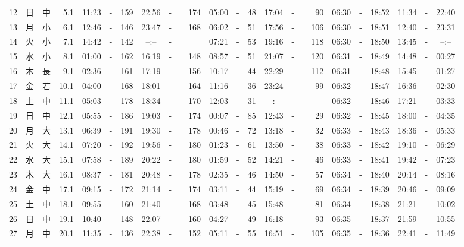 \documentclass[12pt,a4j]{jsarticle}
\begin{document}
\begin{table}[htbp]
\begin{center}
{\begin{tabular}{|rc|cr|ccrccr|ccrccr|ccc|ccc|}
12 & 日 & 中 &  5.1 &  11:23 &-& 159 &  22:56 &-& 174 &  05:00 &-&  48 &  17:04 &-&  90 & 06:30 & -& 18:52 & 11:34 & -& 22:40 \\
13 & 月 & 小 &  6.1 &  12:46 &-& 146 &  23:47 &-& 168 &  06:02 &-&  51 &  17:56 &-& 106 & 06:30 & -& 18:51 & 12:40 & -& 23:31 \\
14 & 火 & 小 &  7.1 &  14:42 &-& 142 &  --:-- &-&~~~~~ &  07:21 &-&  53 &  19:16 &-& 118 & 06:30 & -& 18:50 & 13:45 & -& --:-- \\
15 & 水 & 小 &  8.1 &  01:00 &-& 162 &  16:19 &-& 148 &  08:57 &-&  51 &  21:07 &-& 120 & 06:31 & -& 18:49 & 14:48 & -& 00:27 \\
16 & 木 & 長 &  9.1 &  02:36 &-& 161 &  17:19 &-& 156 &  10:17 &-&  44 &  22:29 &-& 112 & 06:31 & -& 18:48 & 15:45 & -& 01:27 \\
17 & 金 & 若 & 10.1 &  04:00 &-& 168 &  18:01 &-& 164 &  11:16 &-&  36 &  23:24 &-&  99 & 06:32 & -& 18:47 & 16:36 & -& 02:30 \\
18 & 土 & 中 & 11.1 &  05:03 &-& 178 &  18:34 &-& 170 &  12:03 &-&  31 &  --:-- &-&~~~~~ & 06:32 & -& 18:46 & 17:21 & -& 03:33 \\
19 & 日 & 中 & 12.1 &  05:55 &-& 186 &  19:03 &-& 174 &  00:07 &-&  85 &  12:43 &-&  29 & 06:32 & -& 18:45 & 18:00 & -& 04:35 \\
20 & 月 & 大 & 13.1 &  06:39 &-& 191 &  19:30 &-& 178 &  00:46 &-&  72 &  13:18 &-&  32 & 06:33 & -& 18:43 & 18:36 & -& 05:33 \\
21 & 火 & 大 & 14.1 &  07:20 &-& 192 &  19:56 &-& 180 &  01:23 &-&  61 &  13:50 &-&  38 & 06:33 & -& 18:42 & 19:10 & -& 06:29 \\
22 & 水 & 大 & 15.1 &  07:58 &-& 189 &  20:22 &-& 180 &  01:59 &-&  52 &  14:21 &-&  46 & 06:33 & -& 18:41 & 19:42 & -& 07:23 \\
23 & 木 & 大 & 16.1 &  08:37 &-& 181 &  20:48 &-& 178 &  02:35 &-&  46 &  14:50 &-&  57 & 06:34 & -& 18:40 & 20:14 & -& 08:16 \\
24 & 金 & 中 & 17.1 &  09:15 &-& 172 &  21:14 &-& 174 &  03:11 &-&  44 &  15:19 &-&  69 & 06:34 & -& 18:39 & 20:46 & -& 09:09 \\
25 & 土 & 中 & 18.1 &  09:55 &-& 160 &  21:40 &-& 168 &  03:48 &-&  45 &  15:48 &-&  81 & 06:34 & -& 18:38 & 21:21 & -& 10:02 \\
26 & 日 & 中 & 19.1 &  10:40 &-& 148 &  22:07 &-& 160 &  04:27 &-&  49 &  16:18 &-&  93 & 06:35 & -& 18:37 & 21:59 & -& 10:55 \\
27 & 月 & 中 & 20.1 &  11:35 &-& 136 &  22:38 &-& 152 &  05:11 &-&  55 &  16:51 &-& 105 & 06:35 & -& 18:36 & 22:41 & -& 11:49 \\

\end{tabular}}
\end{center}
\end{table}
\end{document}
